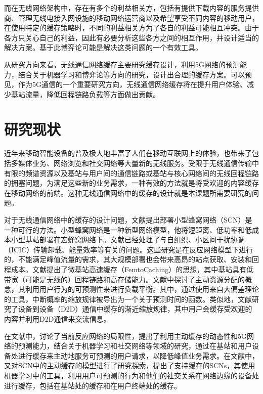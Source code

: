 \documentclass[bachelor]{seuthesis} %
\begin{document}
\begin{Main}
而在无线网络架构中，存在有多个的利益相关方，包括有提供下载内容的服务提供商、管理无线电接入网设施的移动网络运营商以及希望享受不同内容的移动用户，在使用特定的缓存策略时，不同的利益相关方为了各自的利益可能相互冲突。由于各方只关心自己的利益，因此有必要分析这些各方之间的相互作用，并设计适当的解决方案。基于此博弈论可能是解决这类问题的一个有效工具。\par
从研究方向来看，无线通信网络缓存主要研究缓存设计，利用5G网络的预测能力，结合关于机器学习和博弈论等方向的研究，设计出合理的缓存方案。可以预见，作为5G通信的一个重要研究方向，无线通信网络缓存将在提升用户体验、减少基站流量，降低回程链路负载等方面做出贡献。
\section{研究现状}
近年来移动智能设备的普及极大地丰富了人们在移动互联网上的体验，也带来了包括多媒体业务、网络浏览和社交网络等大量新的无线服务。受限于无线通信传输中有限的频谱资源以及基站与用户间的通信链路或基站与核心网络间的无线回程链路的拥塞问题，为满足这些新的业务需求，一种有效的方法就是将受欢迎的内容缓存在移动网络的前端。这种无线通信网络中的缓存的设计就是本课题所需要研究的问题。\par
对于无线通信网络中的缓存的设计问题，文献\cite{andrews2013seven}提出部署小型蜂窝网络（SCN）是一种可行的方法。小型蜂窝网络是一种新型网络模型，他将短距离、低功率和低成本小型基站部署在宏蜂窝网络下。文献\cite{andrews2013seven}已经处理了与自组织、小区间干扰协调（ICIC）传输卸载、能量效率等有关的问题。这些研究是在反应网络模型下进行的，不能满足峰值流量的需求，其大规模部署也会带来高昂的站点获取、安装和回程成本。文献\cite{golrezaei2012femtocaching}提出了微基站高速缓存（FemtoCaching）的思想，其中基站具有低带宽（可能是无线的）回程链路和高存储能力。文献\cite{tadrousproactive}中探讨了主动资源分配的概念，其利用用户行为的可预测性来进行负载平衡。其中，通过使用来自大偏差理论的工具，中断概率的缩放规律被导出为一个关于预测时间的函数。类似地，文献\cite{ji2013fundamental}研究了设备到设备（D2D）通信中缓存的渐近缩放规律，其中用户会缓存受欢迎的内容并利用D2D通信来交流信息。\par
在文献\cite{bastug2014living}中，讨论了当前反应网络的局限性，提出了利用主动缓存的动态性和5G网络的预测能力，结合关于机器学习和社交网络等领域的研究，通过在基站和用户设备处进行缓存来主动地服务可预测的用户请求，以降低峰值业务需求。在文献\cite{bastug2015proactive}中，又对SCN中的主动缓存的模型进行了研究探索，提出了支持缓存的SCNs，其使用机器学习中的工具，利用用户可预测的行为和他们的社交关系在网络边缘的设备处进行缓存，包括在基站处的缓存和在用户终端处的缓存。\par

\end{Main}
\end{document}
